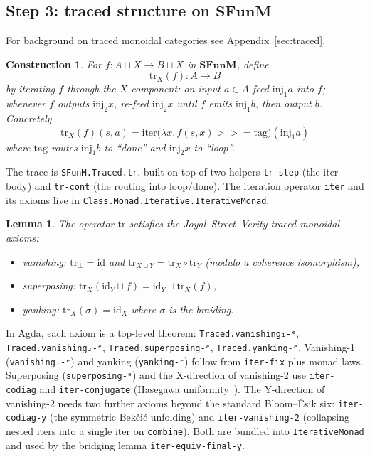 \documentclass[11pt]{article}
\newtheorem{lemma}[theorem]{Lemma}
\newtheorem{construction}[theorem]{Construction}
\newcommand{\SFunM}{\mathbf{SFunM}}
\newcommand{\id}{\mathrm{id}}
\newcommand{\bind}{\mathbin{>\!\!\!>\!\!=}}
\begin{document}
\subsection{Step 3: traced structure on $\SFunM$}

For background on traced monoidal categories see
Appendix~\ref{sec:traced}.

\begin{construction}
For $f : A \sqcup X \to B \sqcup X$ in $\SFunM$, define
\[
  \mathrm{tr}_X(f) : A \to B
\]
by iterating $f$ through the $X$ component: on input $a \in A$ feed
$\mathrm{inj}_1 a$ into $f$; whenever $f$ outputs $\mathrm{inj}_2 x$,
re-feed $\mathrm{inj}_2 x$ until $f$ emits $\mathrm{inj}_1 b$, then
output $b$.  Concretely
\[
  \mathrm{tr}_X(f)(s, a) = \mathrm{iter}\bigl(
      \lambda x.\, f(s, x) \bind \mathrm{tag}\bigr)(\mathrm{inj}_1 a)
\]
where $\mathrm{tag}$ routes $\mathrm{inj}_1 b$ to ``done'' and
$\mathrm{inj}_2 x$ to ``loop''.
\end{construction}

The trace is \texttt{SFunM.Traced.tr}, built on top of two helpers
\texttt{tr-step} (the iter body) and \texttt{tr-cont} (the routing
into loop/done).  The iteration operator \texttt{iter} and its
axioms live in \texttt{Class.Monad.Iterative.IterativeMonad}.

\begin{lemma}\label{lem:traced}
The operator $\mathrm{tr}$ satisfies the Joyal--Street--Verity traced
monoidal axioms:
\begin{itemize}
  \item \emph{vanishing}: $\mathrm{tr}_\bot = \id$ and
        $\mathrm{tr}_{X \sqcup Y} = \mathrm{tr}_X \circ \mathrm{tr}_Y$
        (modulo a coherence isomorphism),
  \item \emph{superposing}:
        $\mathrm{tr}_X(\id_Y \sqcup f) = \id_Y \sqcup \mathrm{tr}_X(f)$,
  \item \emph{yanking}: $\mathrm{tr}_X(\sigma) = \id_X$ where
        $\sigma$ is the braiding.
\end{itemize}
\end{lemma}

In Agda, each axiom is a top-level theorem:
\texttt{Traced.vanishing₁-ᵉ}, \texttt{Traced.vanishing₂-ᵉ},
\texttt{Traced.superposing-ᵉ}, \texttt{Traced.yanking-ᵉ}.  Vanishing-1
(\texttt{vanishing₁-ᵉ}) and yanking (\texttt{yanking-ᵉ}) follow from
\texttt{iter-fix} plus monad laws.  Superposing
(\texttt{superposing-ᵉ}) and the X-direction of vanishing-2 use
\texttt{iter-codiag} and \texttt{iter-conjugate} (Hasegawa
uniformity~\cite{Hasegawa97}).  The Y-direction of vanishing-2 needs
two further axioms beyond the standard Bloom--\'Esik six:
\texttt{iter-codiag-y} (the symmetric Bek\v{c}i\'c unfolding) and
\texttt{iter-vanishing-2} (collapsing nested $\mathrm{iter}$s into a
single $\mathrm{iter}$ on \texttt{combine}).  Both are bundled into
\texttt{IterativeMonad} and used by the bridging lemma
\texttt{iter-equiv-final-y}.
\end{document}
